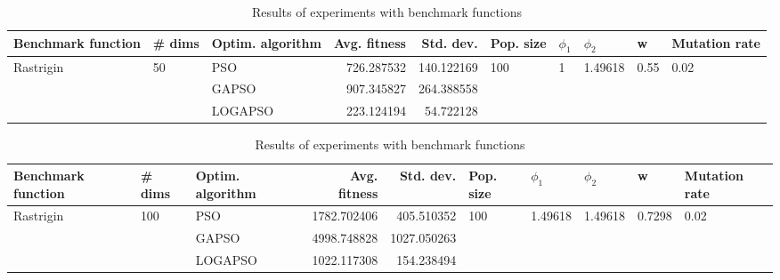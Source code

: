 \documentclass{article}
\begin{document}
\begin{table}
\centering
\caption{Results of experiments with benchmark functions}
\begin{tabular}{lllrrlllll}
\toprule
        Benchmark function &             \# dims & Optim. algorithm &  Avg. fitness &  Std. dev. &            Pop. size &         $\phi_{1}$ &               $\phi_{2}$ &                     w &         Mutation rate \\
\midrule
\multirow{3}{*}{Rastrigin} & \multirow{3}{*}{50} &              PSO &    726.287532 & 140.122169 & \multirow{3}{*}{100} & \multirow{3}{*}{1} & \multirow{3}{*}{1.49618} & \multirow{3}{*}{0.55} & \multirow{3}{*}{0.02} \\
                           &                     &            GAPSO &    907.345827 & 264.388558 &                      &                    &                          &                       &                       \\
                           &                     &          LOGAPSO &    223.124194 &  54.722128 &                      &                    &                          &                       &                       \\
\bottomrule
\end{tabular}
\end{table}
\begin{table}
\centering
\caption{Results of experiments with benchmark functions}
\begin{tabular}{lllrrlllll}
\toprule
        Benchmark function &              \# dims & Optim. algorithm &  Avg. fitness &   Std. dev. &            Pop. size &               $\phi_{1}$ &               $\phi_{2}$ &                       w &         Mutation rate \\
\midrule
\multirow{3}{*}{Rastrigin} & \multirow{3}{*}{100} &              PSO &   1782.702406 &  405.510352 & \multirow{3}{*}{100} & \multirow{3}{*}{1.49618} & \multirow{3}{*}{1.49618} & \multirow{3}{*}{0.7298} & \multirow{3}{*}{0.02} \\
                           &                      &            GAPSO &   4998.748828 & 1027.050263 &                      &                          &                          &                         &                       \\
                           &                      &          LOGAPSO &   1022.117308 &  154.238494 &                      &                          &                          &                         &                       \\
\bottomrule
\end{tabular}
\end{table}
\end{document}
